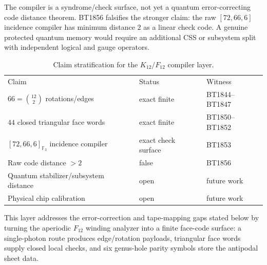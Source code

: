 \begin{remark}
The compiler is a syndrome/check surface, not yet a quantum error-correcting code
distance theorem.  BT1856 falsifies the stronger claim: the raw $[72,66,6]$ incidence
compiler has minimum distance $2$ as a linear check code.  A genuine protected quantum
memory would require an additional CSS or subsystem split with independent logical and
gauge operators.
\end{remark}

\begin{table}[h]
\caption{Claim stratification for the $K_{12}/F_{12}$ compiler layer.}
\begin{ruledtabular}
\begin{tabular}{lll}
Claim & Status & Witness \\
\colrule
$66=\binom{12}{2}$ rotations/edges & exact finite & BT1844--BT1847 \\
$44$ closed triangular face words & exact finite & BT1850--BT1852 \\
$[72,66,6]_{\mathbb F_3}$ incidence compiler & exact check surface & BT1853 \\
Raw code distance $>2$ & false & BT1856 \\
Quantum stabilizer/subsystem distance & open & future work \\
Physical chip calibration & open & future work \\
\end{tabular}
\end{ruledtabular}
\end{table}

This layer addresses the error-correction and tape-mapping gaps stated below by
turning the aperiodic $F_{12}$ winding analyzer into a finite face-code surface: a
single-photon route produces edge/rotation payloads, triangular face words supply
closed local checks, and six genus-hole parity symbols store the antipodal sheet data.
